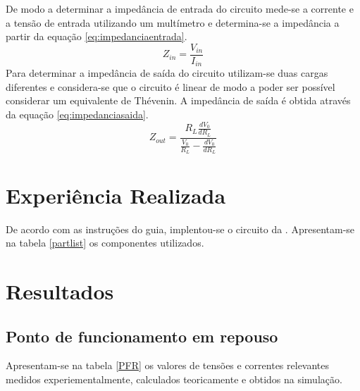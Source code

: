 \documentclass[%
  reprint,
  nofootinbib,
  amsmath,amssymb,
  aps,
  10pt,
  a4paper
]{revtex4-1}
\begin{document}
De modo a determinar a impedância de entrada do circuito mede-se a corrente e a tensão de entrada utilizando um multímetro e determina-se a impedância a partir da equação \ref{eq:impedanciaentrada}.
\begin{equation}
Z_{in}=\frac{V_{in}}{I_{in}}
\label{eq:impedanciaentrada}
\end{equation}
Para determinar a impedância de saída do circuito utilizam-se duas cargas diferentes e considera-se que o circuito é linear de modo a poder ser possível considerar um equivalente de Thévenin. A impedância de saída é obtida através da equação \ref{eq:impedanciasaida}.
\begin{equation}
Z_{out}=\frac{R_L \frac{dV_0}{dR_L}}{\frac{V_0}{R_L}-\frac{dV_0}{dR_L}}
\label{eq:impedanciasaida}
\end{equation}


\section{Experiência Realizada}
\label{s:expreal}
De acordo com as instruções do guia, implentou-se o circuito da . Apresentam-se na tabela \ref{partlist} os componentes utilizados.




\section{Resultados}
\label{s:resul}

\subsection{Ponto de funcionamento em repouso}
Apresentam-se na tabela \ref{PFR} os valores de tensões e correntes relevantes medidos experiementalmente, calculados teoricamente e obtidos na simulação.
\end{document}

